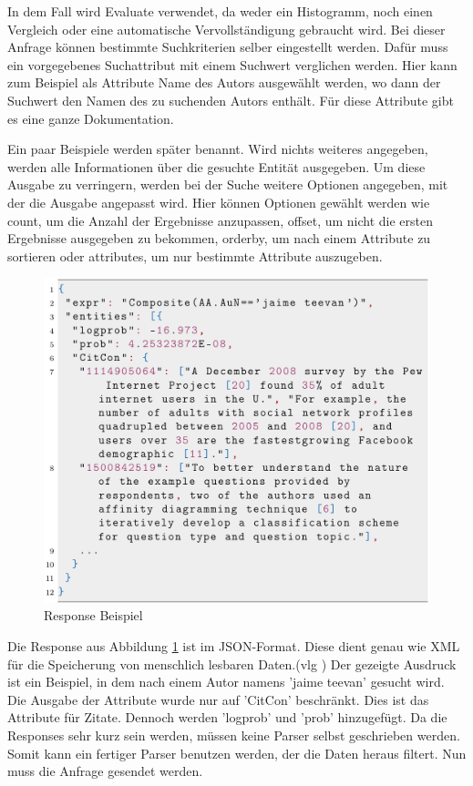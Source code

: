 In dem Fall wird Evaluate verwendet, da weder ein Histogramm, noch einen Vergleich oder eine automatische Vervollständigung gebraucht wird. Bei dieser Anfrage können bestimmte Suchkriterien selber eingestellt werden. Dafür muss ein vorgegebenes Suchattribut mit einem Suchwert verglichen werden. Hier kann zum Beispiel als Attribute Name des Autors ausgewählt werden, wo dann der Suchwert den Namen des zu suchenden Autors enthält. Für diese Attribute gibt es eine ganze Dokumentation.


Ein paar Beispiele werden später benannt. Wird nichts weiteres angegeben, werden alle Informationen über die gesuchte Entität ausgegeben. Um diese Ausgabe zu verringern, werden bei der Suche weitere Optionen angegeben, mit der die Ausgabe angepasst wird. Hier können Optionen gewählt werden wie count, um die Anzahl der Ergebnisse anzupassen, offset, um nicht die ersten Ergebnisse ausgegeben zu bekommen, orderby, um nach einem Attribute zu sortieren oder attributes, um nur bestimmte Attribute auszugeben.


\begin{figure}[!htb]
	\centering
	\includegraphics[width=12cm,keepaspectratio]{bilder/ResponseBeispiel}
	\caption{Response Beispiel}
	\label{fig:response-beispiel}
\end{figure}



Die Response aus Abbildung \ref{fig:response-beispiel} ist im JSON-Format. Diese dient genau wie XML für die Speicherung von menschlich lesbaren Daten.(vlg \cite{json}) Der gezeigte Ausdruck ist ein Beispiel, in dem nach einem Autor namens ’jaime teevan’ gesucht wird. Die Ausgabe der Attribute wurde nur auf ’CitCon’ beschränkt. Dies ist das Attribute für Zitate. Dennoch werden ’logprob’ und ’prob’ hinzugefügt. Da die Responses sehr kurz sein werden, müssen keine Parser selbst geschrieben werden. Somit kann ein fertiger Parser benutzen werden, der die Daten heraus filtert. Nun muss die Anfrage gesendet werden. 

